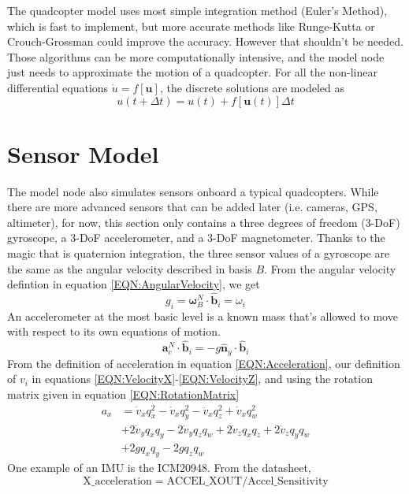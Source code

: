 \documentclass[lettersize,journal]{IEEEtran}
\begin{document}
The quadcopter model uses most simple integration method (Euler's Method), which is fast to implement, but more accurate methods like Runge-Kutta or Crouch-Grossman could improve the accuracy.
However that shouldn't be needed.
Those algorithms can be more computationally intensive, and the model node just needs to approximate the motion of a quadcopter.
For all the non-linear differential equations $\dot{u}=f\left[\mathbf{u}\right]$, the discrete solutions are modeled as
\begin{equation}
  u\left(t+\Delta t\right) = u\left(t\right) + f\left[\mathbf{u}\left(t\right)\right]\Delta t
\end{equation}
\section{Sensor Model}
The model node also simulates sensors onboard a typical quadcopters.
While there are more advanced sensors that can be added later (i.e. cameras, GPS, altimeter), for now, this section only contains a three degrees of freedom (3-DoF) gyroscope, a 3-DoF accelerometer, and a 3-DoF magnetometer.
Thanks to the magic that is quaternion integration, the three sensor values of a gyroscope are the same as the angular velocity described in basis $B$.
From the angular velocity defintion in equation \ref{EQN:AngularVelocity}, we get
\begin{equation}
  g_i = \boldsymbol\omega^N_B \cdot \mathbf{\hat{b}}_i = \omega_i
\end{equation}
An accelerometer at the most basic level is a known mass that's allowed to move with respect to its own equations of motion.
\begin{equation}
  \mathbf{a}^N_c\cdot \mathbf{\hat{b}}_i=-g\mathbf{\hat{n}}_y\cdot\mathbf{\hat{b}}_i
\end{equation}
From the definition of acceleration in equation \ref{EQN:Acceleration}, our definition of $v_i$ in equations \ref{EQN:VelocityX}-\ref{EQN:VelocityZ},  and using the rotation matrix given in equation \ref{EQN:RotationMatrix}
\begin{align}
  a_x &= \dot{v}_xq_x^2-\dot{v}_xq_y^2-\ddot{v}_xq_z^2+\dot{v}_xq_w^2\nonumber\\
  &+2\dot{v}_yq_xq_y-2\dot{v}_yq_zq_w+ 2\dot{v}_z q_xq_z+2\dot{v}_zq_yq_w \nonumber\\
  &+2gq_xq_y-2gq_zq_w
\end{align}
One example of an IMU is the ICM20948. From the datasheet,
\begin{equation}
  \mathrm{X\_acceleration = ACCEL\_XOUT/Accel\_Sensitivity}
\end{equation}
\end{document}
